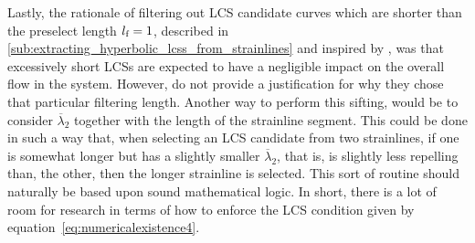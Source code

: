Lastly, the rationale of filtering out LCS candidate curves which are shorter
than the preselect length $l_{\textnormal{f}}=1$, described in
\cref{sub:extracting_hyperbolic_lcss_from_strainlines} and inspired by
\textcite{farazmand2012computing}, was that excessively short LCSs are
expected to have a negligible impact on the overall flow in the system.
However, \citeauthor{farazmand2012computing} do not provide a justification
for why they chose that particular filtering length. Another way to perform this
sifting, would be to consider $\overline{\lambda}_{2}$ together with the length
of the strainline segment. This could be done in such a way that, when selecting
an LCS candidate from two strainlines, if one is somewhat longer but has a
slightly smaller $\overline{\lambda}_{2}$, that is, is slightly less repelling
than, the other, then the longer strainline is selected. This sort of routine
should naturally be based upon sound mathematical logic. In short, there is a
lot of room for research in terms of how to enforce the LCS condition given
by equation~\eqref{eq:numericalexistence4}.

\vspace{\fill}
\clearpage
